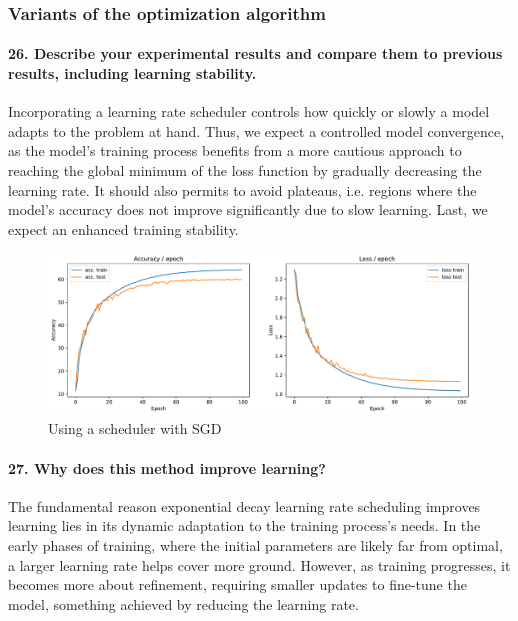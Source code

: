 \documentclass{article}
\theoremstyle{plain}%
\theoremstyle{definition}
\theoremstyle{remark}
\begin{document}
\subsubsection{Variants of the optimization algorithm}
\paragraph{26. Describe your experimental results and compare them to previous results, including learning stability.}

Incorporating a learning rate scheduler controls how quickly or slowly a model adapts to the problem at hand. Thus, we expect a controlled model convergence, as the model's training process benefits from a more cautious approach to reaching the global minimum of the loss function by gradually decreasing the learning rate. It should also permits to avoid plateaus, i.e. regions where the model's accuracy does not improve significantly due to slow learning. Last, we expect an enhanced training stability.

\begin{figure}[H]
    \centering
    \includegraphics*[width=\textwidth]{figs/CNN/optim_variants.pdf}
    \caption{Using a scheduler with SGD}
    \label{fig:optim_variants}
\end{figure}

\paragraph{27. Why does this method improve learning?}
The fundamental reason exponential decay learning rate scheduling improves learning lies in its dynamic adaptation to the training process's needs. In the early phases of training, where the initial parameters are likely far from optimal, a larger learning rate helps cover more ground. However, as training progresses, it becomes more about refinement, requiring smaller updates to fine-tune the model, something achieved by reducing the learning rate.
\end{document}
